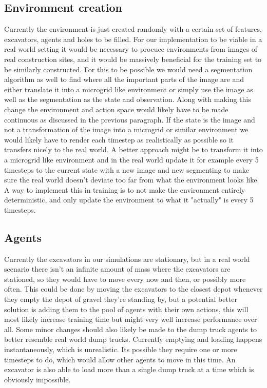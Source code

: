\documentclass[conference]{IEEEtran}
\begin{document}
\subsection{Environment creation}
Currently the environment is just created randomly with a certain set of features, excavators, agents and holes to be filled.
For our implementation to be viable in a real world setting it would be necessary to procuce environments from images of real construction sites, and it would be massively beneficial for the training set to be similarly constructed.
For this to be possible we would need a segmentation algorithm as well to find where all the important parts of the image are and either translate it into a microgrid like environment or simply use the image as well as the segmentation as the state and observation.
Along with making this change the environment and action space would likely have to be made continuous as discussed in the previous paragraph.
If the state is the image and not a transformation of the image into a microgrid or similar environment we would likely have to render each timestep as realistically as possible so it transfers nicely to the real world.
A better approach might be to transform it into a microgrid like environment and in the real world update it for example every 5 timesteps to the current state with a new image and new segmenting to make sure the real world doesn't deviate too far from what the environment looks like.
A way to implement this in training is to not make the environment entirely deterministic, and only update the environment to what it "actually" is every 5 timesteps.

\subsection{Agents}
Currently the excavators in our simulations are stationary, but in a real world scenario there isn't an infinite amount of mass where the excavators are stationed, so they would have to move every now and then, or possibly more often.
This could be done by moving the excavators to the closest depot whenever they empty the depot of gravel they're standing by, but a potential better solution is adding them to the pool of agents with their own actions, this will most likely increase training time but might very well increase performance over all.
Some minor changes should also likely be made to the dump truck agents to better resemble real world dump trucks.
Currently emptying and loading happens instantaneously, which is unrealistic. Its possible they require one or more timesteps to do, which would allow other agents to move in this time.
An excavator is also able to load more than a single dump truck at a time which is obviously impossible.
\end{document}
